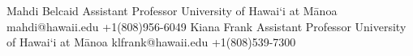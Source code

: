 %
%
%

\begin{referees}
		{Mahdi Belcaid}
		{Assistant Professor}
		{University of Hawai‘i at Mānoa}
		{mahdi@hawaii.edu}
		{+1(808)956-6049}
		{Kiana Frank}
		{Assistant Professor}
		{University of Hawai‘i at Mānoa}
		{klfrank@hawaii.edu}
		{+1(808)539-7300}
\end{referees}